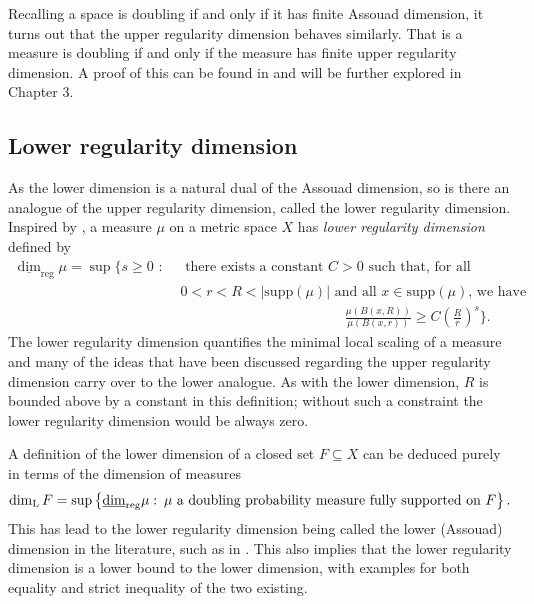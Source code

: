 Recalling a space is doubling if and only if it has finite Assouad dimension, it turns out that the upper regularity dimension behaves similarly. That is a measure is doubling if and only if the measure has finite upper regularity dimension. A proof of this can be found in \cite[Lemma 3.2]{kaenmakinew} and will be further explored in Chapter 3. 


\subsection{Lower regularity dimension}
\label{sec:intro-lower-reg}


As the lower dimension is a natural dual of the Assouad dimension, so is there an analogue of the upper regularity dimension, called the lower regularity dimension. Inspired by \cite{bylund}, a measure $\mu$ on a metric space $X$ has \textit{lower regularity dimension} defined by 
\begin{align*} 
\underline{\dim}_{\text{reg}} \mu = \sup \Bigg\{ s \geq 0 \, \,  : \,  &\,\text{ there exists a  constant }C  > 0\text{  such that, for all }  \\ & \, 0< r< R < \lvert \text{supp}(\mu)    \rvert \text{  and all $x \in \text{supp} (\mu)$, we have }  \\  & \hspace{5cm} \frac{\mu(B(x,R))}{\mu(B(x,r))} \geq C\left(\frac{R}{r}\right)^{s} \Bigg\}.
\end{align*}
The lower regularity dimension quantifies the minimal local scaling of a measure and many of the ideas that have been discussed regarding the upper regularity dimension carry over to the lower analogue. As with the lower dimension, $R$ is bounded above by a constant in this definition; without such a constraint the lower regularity dimension would be always zero.

A definition of the lower dimension of a closed set $F\subseteq X$ can be deduced purely in terms of the dimension of measures
\begin{equation}
    \dim_{\text{L}} F = \sup \left\{ \underline{\dim}_{\textup{reg}} \mu \,  \colon \, \mu \text{ a doubling probability measure fully supported on } F\right\}.
\end{equation}
This has lead to the lower regularity dimension being called the lower (Assouad) dimension in the literature, such as in \cite{hare-troscheit}. This also implies that the lower regularity dimension is a lower bound to the lower dimension, with examples for both equality and strict inequality of the two existing.

